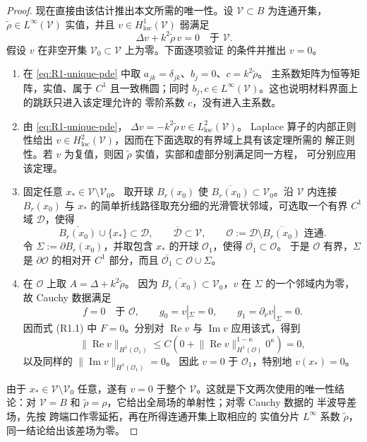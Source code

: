 \begin{proof}
现在直接由该估计推出本文所需的唯一性。设 $\mathcal V\subset B$ 为连通开集，
$\widetilde\rho\in L^\infty(\mathcal V)$ 实值，并且
$v\in H^1_{\mathrm{loc}}(\mathcal V)$ 弱满足
\[
  \Delta v+k^2\widetilde\rho\,v=0\quad\text{于 }\mathcal V.
  \tag{R1.2}\label{eq:R1-unique-pde}
\]
假设 $v$ 在非空开集 $\mathcal V_0\subset\mathcal V$ 上为零。下面逐项验证
\cite[Theorem~3.3.1]{Isakov2017} 的条件并推出 $v=0$。
\begin{enumerate}[label=\textup{(\arabic*)},leftmargin=*]
  \item 在 \eqref{eq:R1-unique-pde} 中取
  $a_{jk}=\delta_{jk}$、$b_j=0$、$c=k^2\widetilde\rho$。
  主系数矩阵为恒等矩阵，实值、属于 $C^1$ 且一致椭圆；同时
  $b_j,c\in L^\infty(\mathcal V)$。这也说明材料界面上的跳跃只进入该定理允许的
  零阶系数 $c$，没有进入主系数。
  \item 由 \eqref{eq:R1-unique-pde}，
  $\Delta v=-k^2\widetilde\rho\,v\in L^2_{\mathrm{loc}}(\mathcal V)$。
  Laplace 算子的内部正则性给出
  $v\in H^2_{\mathrm{loc}}(\mathcal V)$，因而在下面选取的有界域上具有该定理所需的
  解正则性。若 $v$ 为复值，则因 $\widetilde\rho$ 实值，实部和虚部分别满足同一方程，
  可分别应用该定理。
  \item 固定任意 $x_\ast\in\mathcal V\setminus\mathcal V_0$。
  取开球 $B_r(x_0)$ 使
  $\overline{B_r(x_0)}\subset\mathcal V_0$。沿 $\mathcal V$ 内连接
  $B_r(x_0)$ 与 $x_\ast$ 的简单折线路径取充分细的光滑管状邻域，可选取一个有界
  $C^1$ 域 $\mathcal D$，使得
  \[
    \overline{B_r(x_0)}\cup\{x_\ast\}
    \subset\mathcal D,
    \qquad \overline{\mathcal D}\subset\mathcal V,
    \qquad
    \mathcal O:=\mathcal D\setminus\overline{B_r(x_0)}
    \text{ 连通}.
  \]
  令 $\Sigma:=\partial B_r(x_0)$，并取包含 $x_\ast$ 的开球
  $\mathcal O_1$，使得 $\overline{\mathcal O_1}\subset\mathcal O$。
  于是 $\mathcal O$ 有界，$\Sigma$ 是
  $\partial\mathcal O$ 的相对开 $C^1$ 部分，而且
  $\overline{\mathcal O_1}\subset\mathcal O\cup\Sigma$。
  \item 在 $\mathcal O$ 上取 $A=\Delta+k^2\widetilde\rho$。
  因为 $\overline{B_r(x_0)}\subset\mathcal V_0$，$v$ 在 $\Sigma$ 的一个邻域内为零，
  故 Cauchy 数据满足
  \[
    f=0\quad\text{于 }\mathcal O,
    \qquad g_0=v|_\Sigma=0,
    \qquad g_1=\partial_\nu v|_\Sigma=0.
  \]
  因而式 \textup{(R1.1)} 中 $F=0$。分别对 $\operatorname{Re}v$ 与
  $\operatorname{Im}v$ 应用该式，得到
  \[
    \lVert\operatorname{Re}v\rVert_{H^1(\mathcal O_1)}
    \leq C\left(0+
      \lVert\operatorname{Re}v\rVert_{H^1(\mathcal O)}^{1-\kappa}0^\kappa
    \right)=0,
  \]
  以及同样的
  $\lVert\operatorname{Im}v\rVert_{H^1(\mathcal O_1)}=0$。
  因此 $v=0$ 于 $\mathcal O_1$，特别地 $v(x_\ast)=0$。
\end{enumerate}
由于 $x_\ast\in\mathcal V\setminus\mathcal V_0$ 任意，遂有
$v=0$ 于整个 $\mathcal V$。这就是下文两次使用的唯一性结论：对
$\mathcal V=B$ 和 $\widetilde\rho=\rho$，它给出全局场的单射性；对零 Cauchy 数据的
半波导差场，先按 跨端口作零延拓，再在所得连通开集上取相应的
实值分片 $L^\infty$ 系数 $\widetilde\rho$，同一结论给出该差场为零。


\end{proof}
